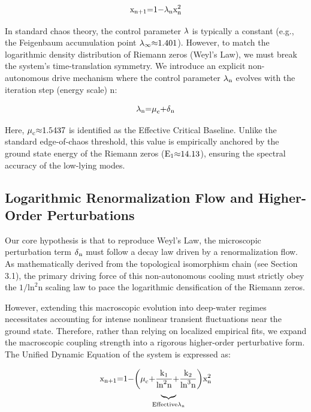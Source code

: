 \documentclass[fleqn,10pt]{wlscirep}
\begin{document}
\[\text{x}_{\text{n}\text{+1}}\text{=1\ensuremath{-}}\text{\ensuremath{\lambda}}_{\text{n}}\text{x}_{\text{n}}^{\text{2}}\]

In standard chaos theory, the control parameter \(\text{\ensuremath{\lambda}}\) is
typically a constant (e.g., the Feigenbaum accumulation point
\(\text{\ensuremath{\lambda}}_{\text{\ensuremath{\infty}}}\text{\ensuremath{\approx}1.401}\)). However, to match the logarithmic
density distribution of Riemann zeros (Weyl's Law), we must break the
system's time-translation symmetry. We introduce an explicit
non-autonomous drive mechanism where the control parameter
\(\text{\ensuremath{\lambda}}_{\text{n}}\) evolves with the iteration step (energy scale)
\(\text{n}\):

\[\text{\ensuremath{\lambda}}_{\text{n}}\text{=}\text{\ensuremath{\mu}}_{\text{c}}\text{+}\text{\ensuremath{\delta}}_{\text{n}}\]

Here, \(\text{\ensuremath{\mu}}_{\text{c}}\text{\ensuremath{\approx}1.5437}\) is identified as the
Effective Critical Baseline. Unlike the standard edge-of-chaos
threshold, this value is empirically anchored by the ground state energy
of the Riemann zeros (\(\text{E}_{\text{1}}\text{\ensuremath{\approx}14.13}\)), ensuring
the spectral accuracy of the low-lying modes.

\subsection*{Logarithmic Renormalization Flow and Higher-Order Perturbations}

Our core hypothesis is that to reproduce Weyl's Law, the microscopic
perturbation term \(\text{\ensuremath{\delta}}_{\text{n}}\) must follow a decay law driven
by a renormalization flow. As mathematically derived from the
topological isomorphism chain (see Section 3.1), the primary driving
force of this non-autonomous cooling must strictly obey the
\(\text{1/}\text{ln}^{\text{2}}\text{n}\) scaling law to pace the
logarithmic densification of the Riemann zeros.

However, extending this macroscopic evolution into deep-water regimes
necessitates accounting for intense nonlinear transient fluctuations
near the ground state. Therefore, rather than relying on localized
empirical fits, we expand the macroscopic coupling strength into a
rigorous higher-order perturbative form. The Unified Dynamic Equation of
the system is expressed as:

\[\text{x}_{\text{n}\text{+1}}\text{=1\ensuremath{-}}\underset{\text{Effective}\text{\ensuremath{\lambda}}_{\text{n}}}{\underset{\text{\ensuremath{\underbrace{\phantom{x}}}}}{\left( \text{\ensuremath{\mu}}_{\text{c}}\text{+}\frac{\text{k}_{\text{1}}}{\text{ln}^{\text{2}}\text{n}}\text{+}\frac{\text{k}_{\text{2}}}{\text{ln}^{\text{3}}\text{n}} \right)}}\text{x}_{\text{n}}^{\text{2}}\]
\end{document}
